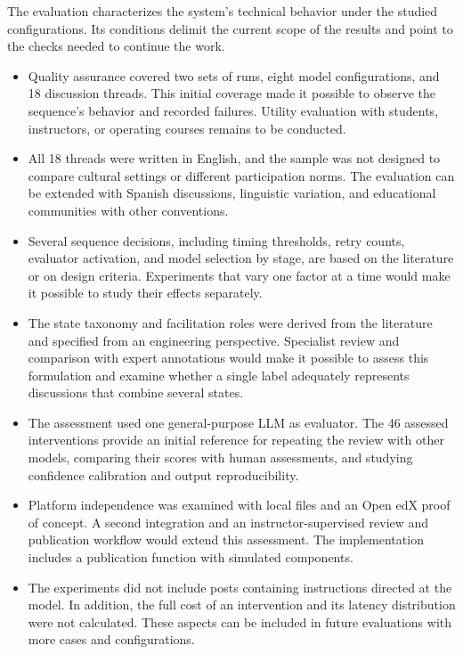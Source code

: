 The evaluation characterizes the system's technical behavior under the studied configurations. Its conditions delimit the current scope of the results and point to the checks needed to continue the work.

\begin{itemize}
	\item Quality assurance covered two sets of runs, eight model configurations, and 18 discussion threads. This initial coverage made it possible to observe the sequence's behavior and recorded failures. Utility evaluation with students, instructors, or operating courses remains to be conducted.
	\item All 18 threads were written in English, and the sample was not designed to compare cultural settings or different participation norms. The evaluation can be extended with Spanish discussions, linguistic variation, and educational communities with other conventions.
	\item Several sequence decisions, including timing thresholds, retry counts, evaluator activation, and model selection by stage, are based on the literature or on design criteria. Experiments that vary one factor at a time would make it possible to study their effects separately.
	\item The state taxonomy and facilitation roles were derived from the literature and specified from an engineering perspective. Specialist review and comparison with expert annotations would make it possible to assess this formulation and examine whether a single label adequately represents discussions that combine several states.
	\item The assessment used one general-purpose LLM as evaluator. The 46 assessed interventions provide an initial reference for repeating the review with other models, comparing their scores with human assessments, and studying confidence calibration and output reproducibility.
\item Platform independence was examined with local files and an Open edX proof of concept. A second integration and an instructor-supervised review and publication workflow would extend this assessment. The implementation includes a publication function with simulated components.
	\item The experiments did not include posts containing instructions directed at the model. In addition, the full cost of an intervention and its latency distribution were not calculated. These aspects can be included in future evaluations with more cases and configurations.
\end{itemize}

